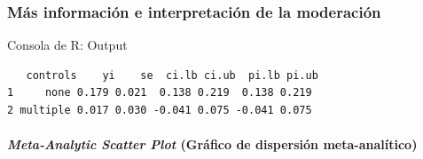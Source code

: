 \documentclass[
  bookmarksnumbered]{article}
\newenvironment{Shaded}{\begin{snugshade}}{\end{snugshade}}
\newcommand{\AttributeTok}[1]{\textcolor[rgb]{0.00,0.34,0.68}{#1}}
\newcommand{\DecValTok}[1]{\textcolor[rgb]{0.69,0.50,0.00}{#1}}
\newcommand{\FunctionTok}[1]{\textcolor[rgb]{0.39,0.29,0.61}{#1}}
\newcommand{\NormalTok}[1]{\textcolor[rgb]{0.12,0.11,0.11}{#1}}
\newcommand{\OtherTok}[1]{\textcolor[rgb]{0.00,0.43,0.16}{#1}}
\newcommand{\SpecialCharTok}[1]{\textcolor[rgb]{0.24,0.68,0.91}{#1}}
\begin{document}
\hypertarget{pred-mods2}{%
\subsubsection{Más información e interpretación de la moderación}\label{pred-mods2}}

\begin{Shaded}
\end{Shaded}

\begin{ROut}{Consola de R: Output~\thetcbcounter}
                \begin{footnotesize}
                \begin{verbatim}   controls    yi    se  ci.lb ci.ub  pi.lb pi.ub
1     none 0.179 0.021  0.138 0.219  0.138 0.219
2 multiple 0.017 0.030 -0.041 0.075 -0.041 0.075
 \end{verbatim}
                \end{footnotesize}
                \end{ROut}

\hypertarget{meta-analytic-scatter-plot-gruxe1fico-de-dispersiuxf3n-meta-analuxedtico-1}{%
\paragraph{\texorpdfstring{\emph{Meta-Analytic Scatter Plot} (Gráfico de dispersión meta-analítico)}{Meta-Analytic Scatter Plot (Gráfico de dispersión meta-analítico)}}\label{meta-analytic-scatter-plot-gruxe1fico-de-dispersiuxf3n-meta-analuxedtico-1}}
\end{document}
